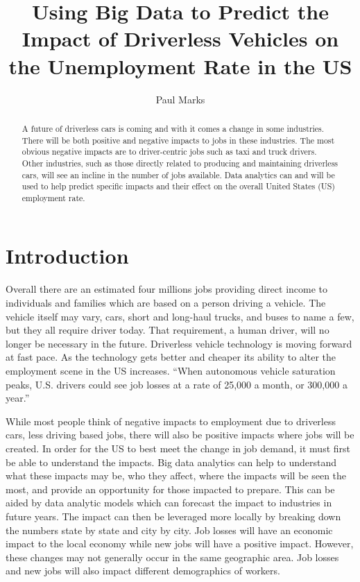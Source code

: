 \documentclass[sigconf]{acmart}
\begin{document}
\title{Using Big Data to Predict the Impact of Driverless Vehicles on the Unemployment Rate in the US}


\author{Paul Marks}


\begin{abstract}
A future of driverless cars is coming and with it comes a change in some 
industries.  There will be both positive and negative impacts to jobs in these 
industries.  The most obvious negative impacts are to driver-centric jobs such 
as taxi and truck drivers.  Other industries, such as those directly related to 
producing and maintaining driverless cars, will see an incline in the number of 
jobs available.  Data analytics can and will be used to help predict specific 
impacts and their effect on the overall United States (US) employment rate.
\end{abstract}


\maketitle

\section{Introduction}

Overall there are an estimated four millions jobs\cite{InsuranceJournal} providing 
direct income to individuals and families which are based on a person driving a 
vehicle.  The vehicle itself may vary, cars, short and long-haul trucks, and 
buses to name a few, but they all require driver today.  That requirement, a 
human driver, will no longer be necessary in the future.  Driverless vehicle 
technology is moving forward at fast pace.  As the technology gets better and 
cheaper its ability to alter the employment scene in the US increases.  ``When 
autonomous vehicle saturation peaks, U.S. drivers could see job losses at a 
rate of 25,000 a month, or 300,000 a year.''\cite{CNBC}

While most people think of negative impacts to employment due to driverless 
cars, less driving based jobs, there will also be positive impacts where jobs 
will be created.  In order for the US to best meet the change in job demand, 
it must first be able to understand the impacts.  Big data analytics can help 
to understand what these impacts may be, who they affect, where the impacts 
will be seen the most, and provide an opportunity for those impacted to 
prepare.  This can be aided by data analytic models which can forecast the 
impact to industries in future years.  The impact can then be leveraged more 
locally by breaking down the numbers state by state and city by city.  Job 
losses will have an economic impact to the local economy while new jobs will 
have a positive impact.  However, these changes may not generally occur in 
the same geographic area.  Job losses and new jobs will also impact different 
demographics of workers.
\end{document}
